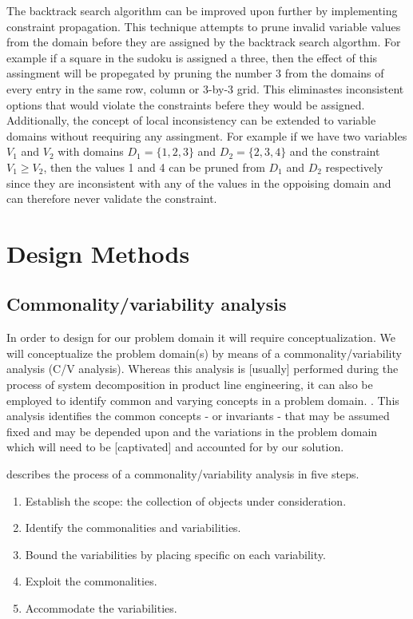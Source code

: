 The backtrack search algorithm can be improved upon further by implementing constraint propagation. This technique attempts to prune invalid variable values from the domain before they are assigned by the backtrack search algorthm. For example if a square in the sudoku is assigned a three, then the effect of this assingment will be propegated by pruning the number 3 from the domains of every entry in the same row, column or 3-by-3 grid. This eliminastes inconsistent options that would violate the constraints befere they would be assigned. Additionally, the concept of local inconsistency can be extended to variable domains without reequiring any assingment. For example if we have two variables $V_1$ and $V_2$ with domains $D_1=\{1,2,3\}$ and $D_2=\{2,3,4\}$ and the constraint $V_1 \geq V_2$, then the values 1 and 4 can be pruned from $D_1$ and $D_2$ respectively since they are inconsistent with any of the values in the oppoising domain and can therefore never validate the constraint. \cite{constraint_general, constraint_algorithm}
\section{Design Methods}
\subsection{Commonality/variability analysis}
\label{sec:back:cv_analysis}
In order to design for our problem domain it will require conceptualization. We will conceptualize the problem domain(s) by means of a commonality/variability analysis (C/V analysis). Whereas this analysis is [usually] performed during the process of system decomposition in product line engineering, it can also be employed to identify common and varying concepts in a problem domain. \cite{cva_problem_domain}.  This analysis identifies the common concepts - or invariants - that may be assumed fixed and may be depended upon and the variations in the problem domain which will need to be [captivated] and accounted for by our solution.

\cite{cv_analysis} describes the process of a commonality/variability analysis in five steps.

\begin{enumerate}
\nospace
\item Establish the scope: the collection of objects
under consideration.
\item Identify the commonalities and variabilities.
\item Bound the variabilities by placing specific on each variability.
\item Exploit the commonalities.
\item Accommodate the variabilities.
\end{enumerate}

